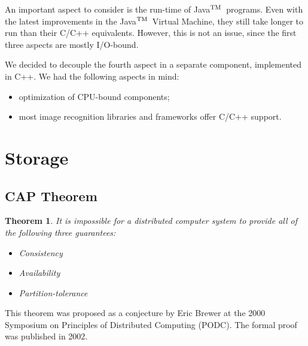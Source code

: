 \documentclass[a4paper,onecolumn,oneside,titlepage,12pt]{report}
\def\tm{\leavevmode\hbox{$\rm {}^{TM}$}}
\begin{document}
An important aspect to consider is the run-time of Java\tm\  programs. Even with the latest improvements in the Java\tm\ Virtual Machine, they still take longer to run than their C/C++ equivalents. However, this is not an issue, since the first three aspects are mostly I/O-bound.

We decided to decouple the fourth aspect in a separate component, implemented in C++. We had the following aspects in mind:
\begin{itemize}
	\item optimization of CPU-bound components;
	\item most image recognition libraries and frameworks offer C/C++ support.
\end{itemize}
\section{Storage}
	\subsection{CAP Theorem}
	\newtheorem{capthm}{Theorem}
	\begin{capthm}
	It is impossible for a distributed computer system to provide all of the following three guarantees:
	\begin{itemize}
		\item Consistency
		\item Availability
		\item Partition-tolerance
	\end{itemize}
	\end{capthm}
	This theorem was proposed as a conjecture by Eric Brewer at the 2000 Symposium on Principles of Distributed Computing (PODC). The formal proof was published in 2002.
	
\end{document}
